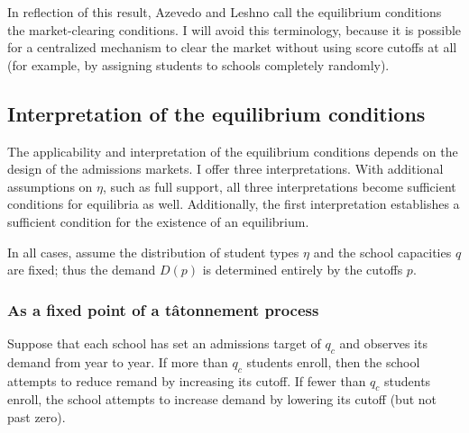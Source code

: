 \documentclass[12pt]{article}
\theoremstyle{definition}
\begin{document}
In reflection of this result, Azevedo and Leshno \parencite*{supplydemandfw} call the equilibrium conditions the market-clearing conditions. I will avoid this terminology, because it is possible for a centralized mechanism to clear the market without using score cutoffs at all (for example, by assigning students to schools completely randomly). 

\subsection{Interpretation of the equilibrium conditions}
The applicability and interpretation of the equilibrium conditions depends on the design of the admissions markets. I offer three interpretations. With additional assumptions on $\eta$, such as full support, all three interpretations become sufficient conditions for equilibria as well. Additionally, the first interpretation establishes a sufficient condition for the existence of an equilibrium. 

In all cases, assume the distribution of student types $\eta$ and the school capacities $q$ are fixed; thus the demand $D(p)$ is determined entirely by the cutoffs $p$. 

\subsubsection{As a fixed point of a t\^{a}tonnement process} \label{asafixedpoint}
Suppose that each school has set an admissions target of $q_c$ and observes its demand from year to year. If more than $q_c$ students enroll, then the school attempts to reduce remand by increasing its cutoff. If fewer than $q_c$ students enroll, the school attempts to increase demand by lowering its cutoff (but not past zero). 
\end{document}

